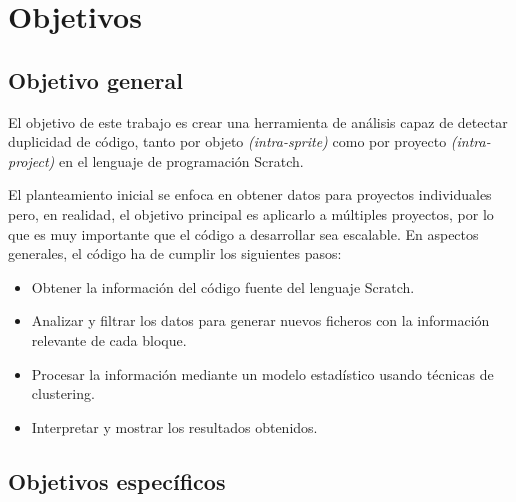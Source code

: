 \documentclass[a4paper, 12pt]{book}
\begin{document}

\cleardoublepage %
\chapter{Objetivos} %
\label{chap:objetivos} %

\section{Objetivo general} %
\label{sec:objetivo-general} %

El objetivo de este trabajo es crear una herramienta de análisis capaz de detectar duplicidad de código, tanto por objeto \textit{(intra-sprite)} como por proyecto \textit{(intra-project)} en el lenguaje de programación Scratch.

El planteamiento inicial se enfoca en obtener datos para proyectos individuales pero, en realidad, el objetivo principal es aplicarlo a múltiples proyectos, por lo que es muy importante que el código a desarrollar sea escalable. En aspectos generales, el código ha de cumplir los siguientes pasos:

\begin{itemize}
  \item Obtener la información del código fuente del lenguaje Scratch.
  \item Analizar y filtrar los datos para generar nuevos ficheros con la información relevante de cada bloque.
  \item Procesar la información mediante un modelo estadístico usando técnicas de clustering.
  \item Interpretar y mostrar los resultados obtenidos.
\end{itemize}


\section{Objetivos específicos}
\label{sec:objetivos-especificos}
\end{document}
